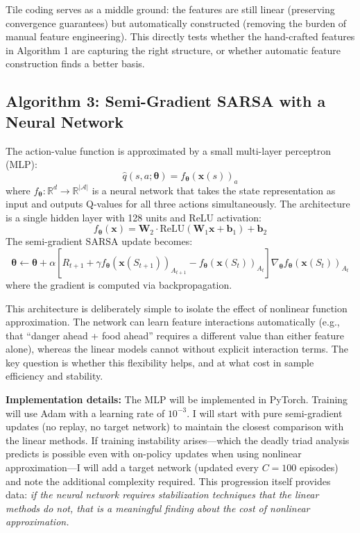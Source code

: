\documentclass[11pt]{article}
\begin{document}
Tile coding serves as a middle ground: the features are still linear (preserving convergence guarantees) but automatically constructed (removing the burden of manual feature engineering). This directly tests whether the hand-crafted features in Algorithm 1 are capturing the right structure, or whether automatic feature construction finds a better basis.

\subsection{Algorithm 3: Semi-Gradient SARSA with a Neural Network}

The action-value function is approximated by a small multi-layer perceptron (MLP):
\begin{equation}
    \hat{q}(s, a; \boldsymbol{\theta}) = f_{\boldsymbol{\theta}}(\mathbf{x}(s))_a
\end{equation}
where $f_{\boldsymbol{\theta}}: \mathbb{R}^d \to \mathbb{R}^{|\mathcal{A}|}$ is a neural network that takes the state representation as input and outputs Q-values for all three actions simultaneously. The architecture is a single hidden layer with 128 units and ReLU activation:
\begin{equation}
    f_{\boldsymbol{\theta}}(\mathbf{x}) = \mathbf{W}_2 \cdot \text{ReLU}(\mathbf{W}_1 \mathbf{x} + \mathbf{b}_1) + \mathbf{b}_2
\end{equation}
The semi-gradient SARSA update becomes:
\begin{equation}
    \boldsymbol{\theta} \leftarrow \boldsymbol{\theta} + \alpha \left[ R_{t+1} + \gamma f_{\boldsymbol{\theta}}(\mathbf{x}(S_{t+1}))_{A_{t+1}} - f_{\boldsymbol{\theta}}(\mathbf{x}(S_t))_{A_t} \right] \nabla_{\boldsymbol{\theta}} f_{\boldsymbol{\theta}}(\mathbf{x}(S_t))_{A_t}
\end{equation}
where the gradient is computed via backpropagation.

This architecture is deliberately simple to isolate the effect of nonlinear function approximation. The network can learn feature interactions automatically (e.g., that ``danger ahead + food ahead'' requires a different value than either feature alone), whereas the linear models cannot without explicit interaction terms. The key question is whether this flexibility helps, and at what cost in sample efficiency and stability.

\textbf{Implementation details:} The MLP will be implemented in PyTorch. Training will use Adam \citep{kingma2015adam} with a learning rate of $10^{-3}$. I will start with pure semi-gradient updates (no replay, no target network) to maintain the closest comparison with the linear methods. If training instability arises---which the deadly triad analysis predicts is possible even with on-policy updates when using nonlinear approximation---I will add a target network (updated every $C = 100$ episodes) and note the additional complexity required. This progression itself provides data: \emph{if the neural network requires stabilization techniques that the linear methods do not, that is a meaningful finding about the cost of nonlinear approximation.}
\end{document}
